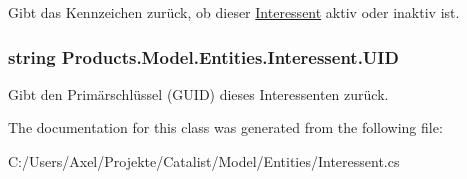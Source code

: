 Gibt das Kennzeichen zurück, ob dieser \hyperlink{class_products_1_1_model_1_1_entities_1_1_interessent}{Interessent} aktiv oder inaktiv ist. 

\subsubsection[{\texorpdfstring{U\+ID}{UID}}]{\setlength{\rightskip}{0pt plus 5cm}string Products.\+Model.\+Entities.\+Interessent.\+U\+ID\hspace{0.3cm}{\ttfamily [get]}}\hypertarget{class_products_1_1_model_1_1_entities_1_1_interessent_a79f2a567b88224628d9a6234ee58d8ba}{}\label{class_products_1_1_model_1_1_entities_1_1_interessent_a79f2a567b88224628d9a6234ee58d8ba}


Gibt den Primärschlüssel (G\+U\+ID) dieses Interessenten zurück. 



The documentation for this class was generated from the following file\+:\begin{DoxyCompactItemize}
\item 
C\+:/\+Users/\+Axel/\+Projekte/\+Catalist/\+Model/\+Entities/Interessent.\+cs\end{DoxyCompactItemize}
